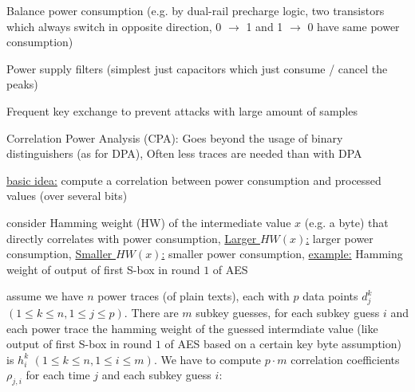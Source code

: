 \documentclass[landscape, a4paper]{article}
\begin{document}
\begin{minipage}[t]{0.2\linewidth}
\begin{betterlist}
\begin{betterlist}
\begin{betterlist}
\begin{betterlist}
				\end{betterlist}
				\item Balance power consumption (e.g. by dual-rail precharge logic, two transistors which always switch in opposite direction, 0 $\rightarrow$ 1 and 1 $\rightarrow$ 0 have same power consumption)
				\item Power supply filters (simplest just capacitors which just consume / cancel the peaks)
				\item Frequent key exchange to prevent attacks with large amount of samples
			\end{betterlist}
		\end{betterlist}
		\item \alert{Correlation Power Analysis (CPA):} Goes beyond the usage of binary distinguishers (as for DPA), Often less traces are needed than with DPA
		\begin{betterlist}
			\item \underline{basic idea:} compute a correlation between \alert{power consumption} and \alert{processed values} (over several bits)
			\begin{betterlist}
				\item consider \alert{Hamming weight (HW)} of the intermediate value $x$ (e.g. a byte) that directly \alert{correlates with power consumption}, \underline{Larger $HW(x)$:} larger power consumption, \underline{Smaller $HW(x)$:} smaller power consumption, \underline{example:} Hamming weight of output of first S-box in round $1$ of AES
				\item assume we have $n$ \alert{power traces (of plain texts)}, each with $p$ data points $d_j^k$ $(1 \le k \le n, 1 \le j \le p)$. There are $m$ subkey guesses, for each subkey guess $i$ and each power trace the \alert{hamming weight of the guessed intermdiate value} (like output of first S-box in round $1$ of AES based on a certain key byte assumption) is $h_i^k$ $(1 \le k \le n, 1 \le i \le m)$. We have to compute $p \cdot m$ correlation coefficients $ρ_{j,i}$ for each time $j$ and each subkey guess $i$:


\end{betterlist}
\end{betterlist}
\end{betterlist}
\end{minipage}
\end{document}
